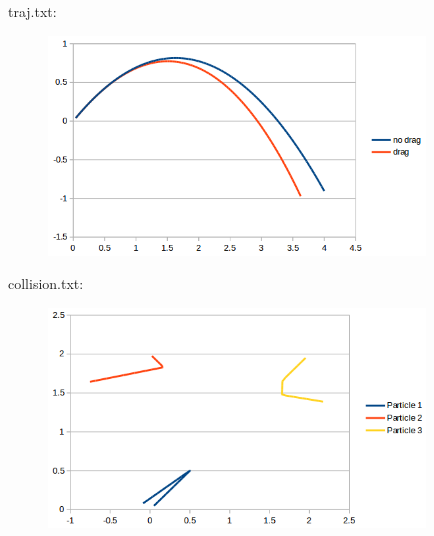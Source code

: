 traj.txt:\\
\begin{scriptsize}
\begin{ttfamily}

\end{ttfamily}
\end{scriptsize}
\begin{center}
\begin{figure}[H]
\centering\includegraphics[width=10cm]{./trajectory.png}\\
\end{figure}
\end{center}

collision.txt:\\
\begin{scriptsize}
\begin{ttfamily}

\end{ttfamily}
\end{scriptsize}
\begin{center}
\begin{figure}[H]
\centering\includegraphics[width=10cm]{./collision.png}\\
\end{figure}
\end{center}


